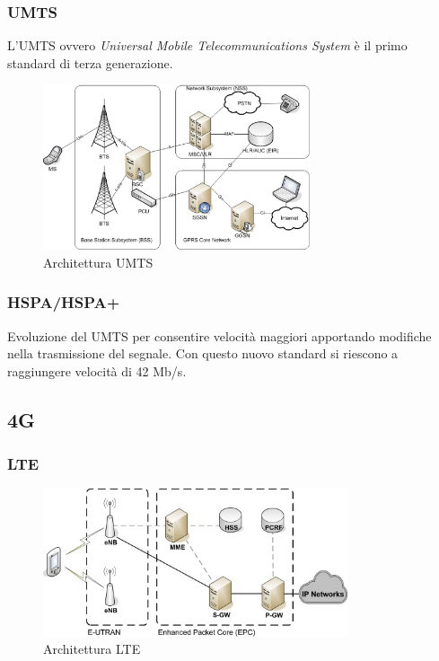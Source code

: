 \subsubsection{UMTS}
L'UMTS ovvero \textit{Universal Mobile Telecommunications System}\cite{umts} è il primo standard di terza generazione.
\begin{figure}[ht]
    \centering
    \includegraphics[width=0.7\textwidth]{images/3g-umts.png}
    \caption{Architettura UMTS}
\end{figure}


\subsubsection{HSPA/HSPA+}
Evoluzione del UMTS per consentire velocità maggiori apportando modifiche nella trasmissione del segnale.
Con questo nuovo standard si riescono a raggiungere velocità di 42 Mb/s\cite{hspa}.

\clearpage

\subsection{4G}
\cite{lte}
\subsubsection{LTE}
\begin{figure}[ht]
    \centering
    \includegraphics[width=0.8\textwidth]{images/4g-lte.jpg}
    \caption{Architettura LTE}
\end{figure}

